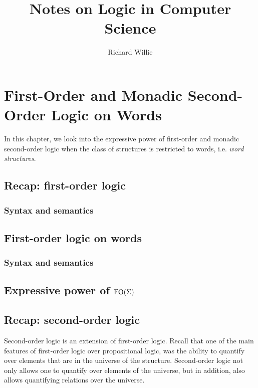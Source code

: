 \documentclass[11pt,twoside=off,numbers=noenddot]{scrbook}
\title{Notes on Logic in Computer Science}
\author{Richard Willie}
\begin{document}
\maketitle

\tableofcontents

\newpage

\chapter{First-Order and Monadic Second-Order Logic on Words}
In this chapter, we look into the expressive power of first-order and monadic second-order logic when the class of structures is restricted to words, i.e. \emph{word structures}.

\section{Recap: first-order logic}

\subsection{Syntax and semantics}

\section{First-order logic on words}

\subsection{Syntax and semantics}

\section{Expressive power of $\text{FO}(\Sigma)$}

\section{Recap: second-order logic}
Second-order logic is an extension of first-order logic. Recall that one of the main features of first-order logic over propositional logic, was the ability to quantify over elements that are in the universe of the structure. Second-order logic not only allows one to quantify over elements of the universe, but in addition, also allows quantifying relations over the universe.
\end{document}
